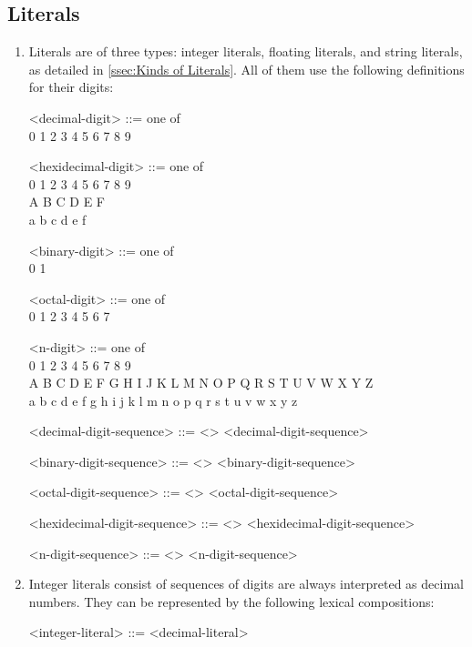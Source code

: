 \subsection{Literals}
\begin{enumerate}
	\item Literals are of three types: integer literals, floating literals, and string literals, as detailed in \ref{ssec:Kinds of Literals}. All of them use the following definitions for their digits:
	\begin{grammar}
		<decimal-digit> ::= one of\\
			0 1 2 3 4 5 6 7 8 9
			
		<hexidecimal-digit> ::= one of\\
			0 1 2 3 4 5 6 7 8 9\\
			A B C D E F\\
			a b c d e f
			
		<binary-digit> ::= one of\\
			0 1
			
		<octal-digit> ::= one of\\
			0 1 2 3 4 5 6 7
					
		<n-digit> ::= one of\\
			0 1 2 3 4 5 6 7 8 9\\
			A B C D E F G H I J K L M N O P Q R S T U V W X Y Z\\
			a b c d e f g h i j k l m n o p q r s t u v w x y z\\
			\lit{_}
			
		<decimal-digit-sequence> ::= <> \alt <decimal-digit> <decimal-digit-sequence>
		
		<binary-digit-sequence> ::= <> \alt <binary-digit> <binary-digit-sequence>
		
		<octal-digit-sequence> ::= <> \alt <octal-digit> <octal-digit-sequence>
	
		<hexidecimal-digit-sequence> ::= <> \alt <hexidecimal-digit> <hexidecimal-digit-sequence>
		
		<n-digit-sequence> ::= <> \alt <n-digit> <n-digit-sequence>
	\end{grammar}
	\item Integer literals consist of sequences of digits are always interpreted as decimal numbers. They can be represented by the following lexical compositions:

	\begin{grammar}
		<integer-literal> ::= 
			<decimal-literal>
			\alt <binary-literal>
			\alt <octal-literal>
			\alt <hexidecimal-literal>
			\alt <n-digit-literal>
			

\end{grammar}
\end{enumerate}
